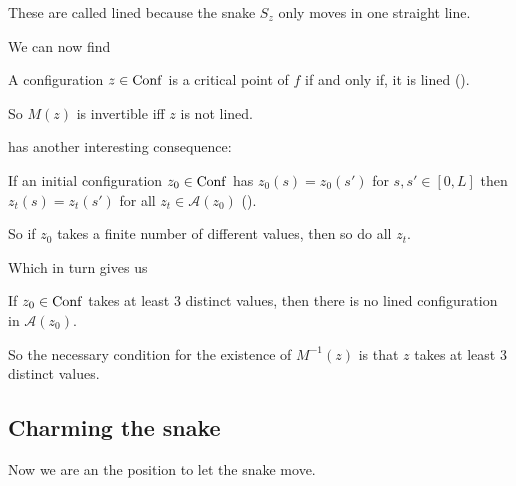 These are called lined because the snake $S_z$ only moves in one straight line.

We can now find

\begin{lemma}\label{lem:critPoint}
    A configuration $z \in \operatorname{Conf}$ is a critical point of $f$ if and only if,
    it is lined (\cite[Proposition 2.6]{Rodriguez07}).
\end{lemma}

So $M(z)$ is invertible iff $z$ is not lined.

 has another interesting consequence:
\begin{corollary}
    If an initial configuration $z_0 \in \operatorname{Conf}$ has $z_0(s) = z_0(s')$
    for $s,s' \in [0,L]$ then $z_t(s) = z_t(s')$ for all $z_t \in \mathcal{A}(z_0)$
    (\cite[Proposition 3.10]{Rodriguez07}).
    
    So if $z_0$ takes a finite number of different values, then so do all $z_t$.
\end{corollary}

Which in turn gives us

\begin{lemma}
    If $z_0 \in \operatorname{Conf}$ takes at least 3 distinct values, then there is no lined
    configuration in $\mathcal{A}(z_0)$.
\end{lemma}

So the necessary condition for the existence of $M^{-1}(z)$ is that $z$ takes at
least 3 distinct values.

\subsection{Charming the snake}
Now we are an the position to let the snake move.

